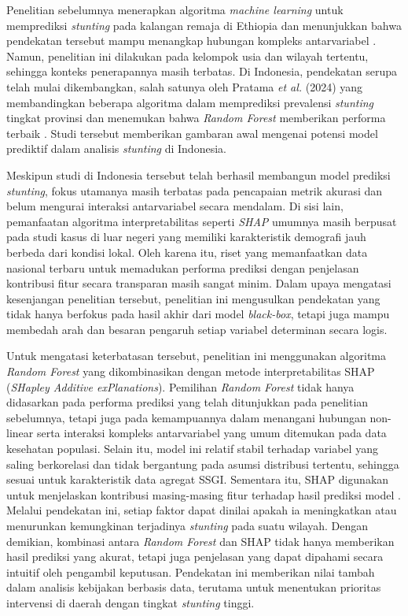 Penelitian sebelumnya menerapkan algoritma \textit{machine learning} untuk memprediksi \textit{stunting} pada kalangan remaja di Ethiopia dan menunjukkan bahwa pendekatan tersebut mampu menangkap hubungan kompleks antarvariabel \cite{zemariam2025prediction}. Namun, penelitian ini dilakukan pada kelompok usia dan wilayah tertentu, sehingga konteks penerapannya masih terbatas. Di Indonesia, pendekatan serupa telah mulai dikembangkan, salah satunya oleh Pratama \textit{et al.} (2024) yang membandingkan beberapa algoritma dalam memprediksi prevalensi \textit{stunting} tingkat provinsi dan menemukan bahwa \textit{Random Forest} memberikan performa terbaik \cite{pratama2024comparison}. Studi tersebut memberikan gambaran awal mengenai potensi model prediktif dalam analisis \textit{stunting} di Indonesia.

Meskipun studi di Indonesia tersebut telah berhasil membangun model prediksi \textit{stunting}, fokus utamanya masih terbatas pada pencapaian metrik akurasi dan belum mengurai interaksi antarvariabel secara mendalam. Di sisi lain, pemanfaatan algoritma interpretabilitas seperti \textit{SHAP} umumnya masih berpusat pada studi kasus di luar negeri yang memiliki karakteristik demografi jauh berbeda dari kondisi lokal. Oleh karena itu, riset yang memanfaatkan data nasional terbaru untuk memadukan performa prediksi dengan penjelasan kontribusi fitur secara transparan masih sangat minim. Dalam upaya mengatasi kesenjangan penelitian tersebut, penelitian ini mengusulkan pendekatan yang tidak hanya berfokus pada hasil akhir dari model \textit{black-box}, tetapi juga mampu membedah arah dan besaran pengaruh setiap variabel determinan secara logis.

Untuk mengatasi keterbatasan tersebut, penelitian ini menggunakan algoritma \textit{Random Forest} yang dikombinasikan dengan metode interpretabilitas SHAP (\textit{SHapley Additive exPlanations}). Pemilihan \textit{Random Forest} tidak hanya didasarkan pada performa prediksi yang telah ditunjukkan pada penelitian sebelumnya, tetapi juga pada kemampuannya dalam menangani hubungan non-linear serta interaksi kompleks antarvariabel yang umum ditemukan pada data kesehatan populasi. Selain itu, model ini relatif stabil terhadap variabel yang saling berkorelasi dan tidak bergantung pada asumsi distribusi tertentu, sehingga sesuai untuk karakteristik data agregat SSGI. Sementara itu, SHAP digunakan untuk menjelaskan kontribusi masing-masing fitur terhadap hasil prediksi model \cite{tamanna2025identifying}. Melalui pendekatan ini, setiap faktor dapat dinilai apakah ia meningkatkan atau menurunkan kemungkinan terjadinya \textit{stunting} pada suatu wilayah. Dengan demikian, kombinasi antara \textit{Random Forest} dan SHAP tidak hanya memberikan hasil prediksi yang akurat, tetapi juga penjelasan yang dapat dipahami secara intuitif oleh pengambil keputusan. Pendekatan ini memberikan nilai tambah dalam analisis kebijakan berbasis data, terutama untuk menentukan prioritas intervensi di daerah dengan tingkat \textit{stunting} tinggi.

